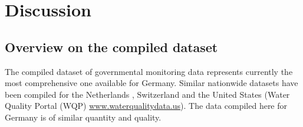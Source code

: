 \documentclass[journal=esthag,manuscript=article]{achemso}
\begin{document}
%
%

\section{Discussion}
\subsection{Overview on the compiled dataset}
The compiled dataset of governmental monitoring data represents currently the most comprehensive one available for Germany.
Similar nationwide datasets have been compiled for the Netherlands \citep{vijver_spatial_2008}, Switzerland \citep{munz_pestizidmessungen_2011} and the United States (Water Quality Portal (WQP) \url{www.waterqualitydata.us}).
The data compiled here for Germany is of similar quantity and quality.
%
%
\end{document}
